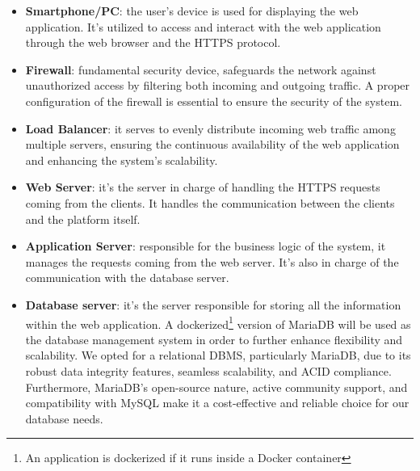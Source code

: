 \documentclass[../DD.tex]{subfiles}
\begin{document}
    \begin{itemize}
        \item {\textbf{Smartphone/PC}: the user's device is used for displaying the web application. It's utilized to access and interact with the web application through the web browser and the HTTPS protocol.}
        \item {\textbf{Firewall}: fundamental security device, safeguards the network against unauthorized access by filtering both incoming and outgoing traffic.
        A proper configuration of the firewall is essential to ensure the security of the system.}
        \item {\textbf{Load Balancer}: it serves to evenly distribute incoming web traffic among multiple servers, ensuring the continuous availability of the web application and enhancing the system's scalability.}
        \item {\textbf{Web Server}: it's the server in charge of handling the HTTPS requests coming from the clients.
        It handles the communication between the clients and the platform itself.}
        \item {\textbf{Application Server}: responsible for the business logic of the system, it manages the requests coming from the web server. 
        It's also in charge of the communication with the database server.}
        \item {\textbf{Database server}: it's the server responsible for storing all the information within the web application.
        A dockerized\footnote{An application is dockerized if it runs inside a Docker container} version of MariaDB will be used as the database management system in order to further enhance flexibility and scalability. We opted for a relational DBMS, particularly MariaDB, due to its robust data integrity features, seamless scalability, and ACID compliance. Furthermore, MariaDB's open-source nature, active community support, and compatibility with MySQL make it a cost-effective and reliable choice for our database needs.}
    \end{itemize}
    \newpage

    
\end{document}
